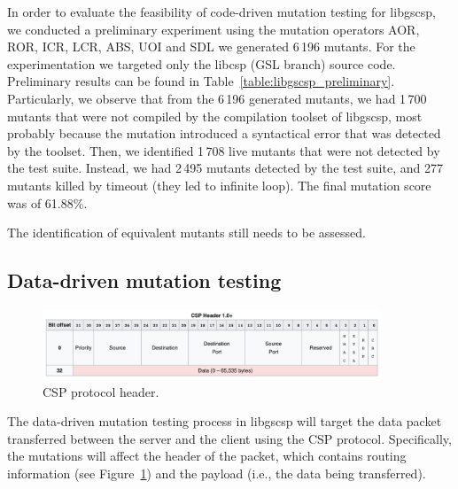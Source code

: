 

In order to evaluate the feasibility of code-driven mutation testing for libgscsp, we conducted a preliminary experiment using the mutation operators AOR, ROR, ICR, LCR, ABS, UOI and SDL we generated 6\,196 mutants. For the experimentation we targeted only the libcsp (GSL branch) source code. Preliminary results can be found in Table~\ref{table:libgscsp_preliminary}.
Particularly, we observe that from the 6\,196 generated mutants, we had 1\,700 mutants that were not compiled by the compilation toolset of libgscsp, most probably because the mutation introduced a syntactical error that was detected by the toolset.
Then, we identified 1\,708 live mutants that were not detected by the test suite. Instead, we had 2\,495 mutants detected by the test suite, and 277 mutants killed by timeout (they led to infinite loop). The final mutation score was of 61.88\%.

The identification of equivalent mutants still needs to be assessed.


\subsection{Data-driven mutation testing}

\begin{figure}[h]
  \centering
    \includegraphics[width=0.9\textwidth]{images/csp_packet}
      \caption{CSP protocol header.}
      \label{fig:csp_packet}
\end{figure}

The data-driven mutation testing process in libgscsp will target the data packet transferred between the server and the client using the CSP protocol. Specifically, the mutations will affect the header of the packet, which contains routing information (see Figure~\ref{fig:csp_packet}) and the payload 
(i.e., the data being transferred).




